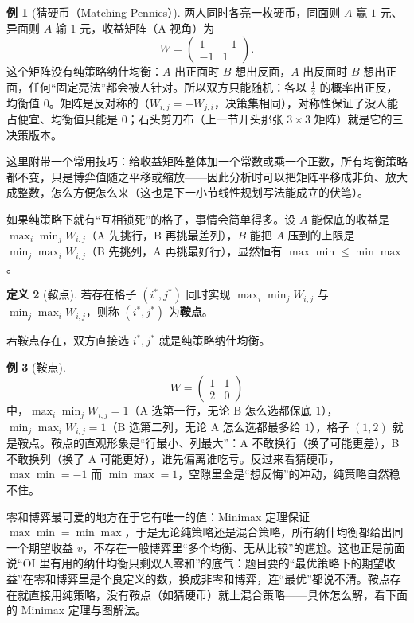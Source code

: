 \documentclass[UTF8,a4paper,11pt,oneside,openany,fontset=fandol]{ctexbook}
\theoremstyle{definition}
\newtheorem{definition}{定义}[chapter]
\newtheorem{example}[definition]{例}
\begin{document}
\begin{example}[猜硬币（Matching Pennies）]\label{ex:pennies}
两人同时各亮一枚硬币，同面则 $A$ 赢 $1$ 元、异面则 $A$ 输 $1$ 元，收益矩阵（A 视角）为
\[
 W=\begin{pmatrix}1&-1\\-1&1\end{pmatrix}.
\]
这个矩阵没有纯策略纳什均衡：$A$ 出正面时 $B$ 想出反面，$A$ 出反面时 $B$ 想出正面，任何“固定亮法”都会被人针对。所以双方只能随机：各以 $\tfrac12$ 的概率出正反，均衡值 $0$。矩阵是反对称的（$W_{i,j}=-W_{j,i}$，决策集相同），对称性保证了没人能占便宜、均衡值只能是 $0$；石头剪刀布（上一节开头那张 $3\times3$ 矩阵）就是它的三决策版本。
\end{example}

这里附带一个常用技巧：给收益矩阵整体加一个常数或乘一个正数，所有均衡策略都不变，只是博弈值随之平移或缩放——因此分析时可以把矩阵平移成非负、放大成整数，怎么方便怎么来（这也是下一小节线性规划写法能成立的伏笔）。

如果纯策略下就有“互相锁死”的格子，事情会简单得多。设 $A$ 能保底的收益是 $\max_i\min_j W_{i,j}$（A 先挑行，B 再挑最差列），$B$ 能把 $A$ 压到的上限是 $\min_j\max_i W_{i,j}$（B 先挑列，A 再挑最好行），显然恒有 $\max\min\le\min\max$。

\begin{definition}[鞍点]
若存在格子 $(i^*,j^*)$ 同时实现 $\max_i\min_j W_{i,j}$ 与 $\min_j\max_i W_{i,j}$，则称 $(i^*,j^*)$ 为\textbf{鞍点}。
\end{definition}

若鞍点存在，双方直接选 $i^*,j^*$ 就是纯策略纳什均衡。

\begin{example}[鞍点]
\[
 W=\begin{pmatrix}1&1\\2&0\end{pmatrix}
\]
中，$\max_i\min_j W_{i,j}=1$（A 选第一行，无论 B 怎么选都保底 $1$），$\min_j\max_i W_{i,j}=1$（B 选第二列，无论 A 怎么选都最多给 $1$），格子 $(1,2)$ 就是鞍点。鞍点的直观形象是“行最小、列最大”：A 不敢换行（换了可能更差），B 不敢换列（换了 A 可能更好），谁先偏离谁吃亏。反过来看猜硬币，$\max\min=-1$ 而 $\min\max=1$，空隙里全是“想反悔”的冲动，纯策略自然稳不住。
\end{example}

零和博弈最可爱的地方在于它有唯一的值：Minimax 定理保证 $\max\min=\min\max$，于是无论纯策略还是混合策略，所有纳什均衡都给出同一个期望收益 $v$，不存在一般博弈里“多个均衡、无从比较”的尴尬。这也正是前面说“OI 里有用的纳什均衡只剩双人零和”的底气：题目要的“最优策略下的期望收益”在零和博弈里是个良定义的数，换成非零和博弈，连“最优”都说不清。鞍点存在就直接用纯策略，没有鞍点（如猜硬币）就上混合策略——具体怎么解，看下面的 Minimax 定理与图解法。
\end{document}
